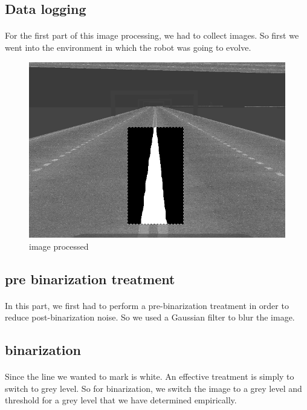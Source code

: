\subsection{Data logging}
\paragraph{}
For the first part of this image processing, we had to collect images.
So first we went into the environment in which the robot was going to evolve.

\begin{figure}[h!]
    \begin{center}
        \includegraphics[scale=0.3]{Images/image_process.png}
    \end{center}
    \caption{image processed}
    \label{fig:capture}
\end{figure}

\subsection{pre binarization treatment}
\paragraph{}
In this part, we first had to perform a pre-binarization treatment in order to reduce post-binarization noise.
So we used a Gaussian filter to blur the image.

\subsection{binarization}
\paragraph{}
Since the line we wanted to mark is white. An effective treatment is simply to switch to grey level. 
So for binarization, we switch the image to a grey level and threshold for a grey level that we have determined empirically.

